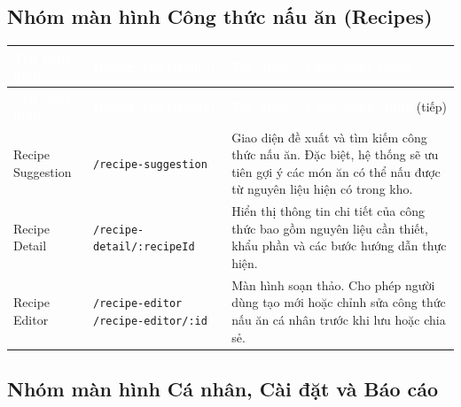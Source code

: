 \documentclass[12pt,a4paper]{article}
\newcommand{\code}[1]{\texttt{#1}}
\newcommand{\thead}[1]{\textbf{\textcolor{white}{#1}}}
\begin{document}
\subsection{Nhóm màn hình Công thức nấu ăn (Recipes)}

\begin{longtable}{|>{\raggedright\arraybackslash}p{3.5cm}|>{\raggedright\arraybackslash}p{4cm}|>{\raggedright\arraybackslash}p{7.5cm}|}
\hline
\rowcolor{headerblue}
\thead{Tên màn hình} & \thead{Đường dẫn (Route)} & \thead{Tác dụng / Chức năng chính} \\
\hline
\endfirsthead
\hline
\rowcolor{headerblue}
\thead{Tên màn hình} & \thead{Đường dẫn (Route)} & \thead{Tác dụng / Chức năng chính} (tiếp) \\
\hline
\endhead
Recipe Suggestion & \code{/recipe-suggestion} & Giao diện đề xuất và tìm kiếm công thức nấu ăn. Đặc biệt, hệ thống sẽ ưu tiên gợi ý các món ăn có thể nấu được từ nguyên liệu hiện có trong kho. \\
\hline
Recipe Detail & \code{/recipe-detail/:recipeId} & Hiển thị thông tin chi tiết của công thức bao gồm nguyên liệu cần thiết, khẩu phần và các bước hướng dẫn thực hiện. \\
\hline
Recipe Editor & \code{/recipe-editor} \newline \code{/recipe-editor/:id} & Màn hình soạn thảo. Cho phép người dùng tạo mới hoặc chỉnh sửa công thức nấu ăn cá nhân trước khi lưu hoặc chia sẻ. \\
\hline
\end{longtable}

\subsection{Nhóm màn hình Cá nhân, Cài đặt và Báo cáo}
\end{document}
